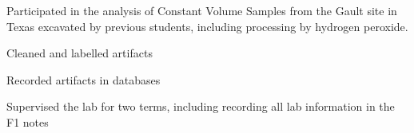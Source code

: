 \documentclass[letterpaper]{resume}
\begin{document}
\begin{compactitem}
\item Participated in the analysis of Constant Volume Samples from the Gault site in Texas excavated by previous students, including processing by hydrogen peroxide.
\item Cleaned and labelled artifacts
\item Recorded artifacts in databases
\item Supervised the lab for two terms, including recording all lab information in the F1 notes
\end{compactitem}
%

\end{document}
